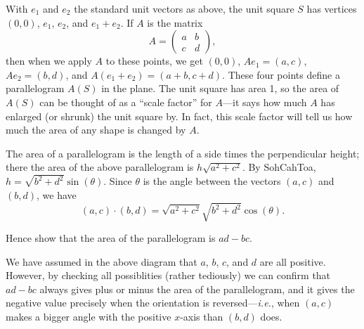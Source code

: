 \documentclass{article}
\begin{document}
With $e_1$ and $e_2$ the standard unit vectors as above, the unit square $S$ has vertices $(0,0)$, $e_1$, $e_2$, and $e_1+e_2$. If $A$ is the matrix
\[A=\left(\begin{array}{cc}a&b\\c&d\end{array}\right),\]
then when we apply $A$ to these points, we get $(0,0)$, $Ae_1=(a,c)$, $Ae_2=(b,d)$, and $A(e_1+e_2)=(a+b,c+d)$. These four points define a parallelogram $A(S)$ in the plane. The unit square has area 1, so the area of $A(S)$ can be thought of as a ``scale factor'' for $A$---it says how much $A$ has enlarged (or shrunk) the unit square by. In fact, this scale factor will tell us how much the area of any shape is changed by $A$.

\begin{center}
\end{center}

The area of a parallelogram is the length of a side times the perpendicular height; there the area of the above parallelogram is $h\sqrt{a^2+c^2}$. By SohCahToa, $h=\sqrt{b^2+d^2}\sin(\theta)$. Since $\theta$ is the angle between the vectors $(a,c)$ and $(b,d)$, we have
\[(a,c)\cdot(b,d) = \sqrt{a^2+c^2}\sqrt{b^2+d^2}\cos(\theta).\]

Hence show that the area of the parallelogram is $ad-bc$.

\vfill


We have assumed in the above diagram that $a$, $b$, $c$, and $d$ are all positive. However, by checking all possiblities (rather tediously) we can confirm that $ad-bc$ always gives plus or minus the area of the parallelogram, and it gives the negative value precisely when the orientation is reversed---\textit{i.e.}, when $(a,c)$ makes a bigger angle with the positive $x$-axis than $(b,d)$ does.
\end{document}
